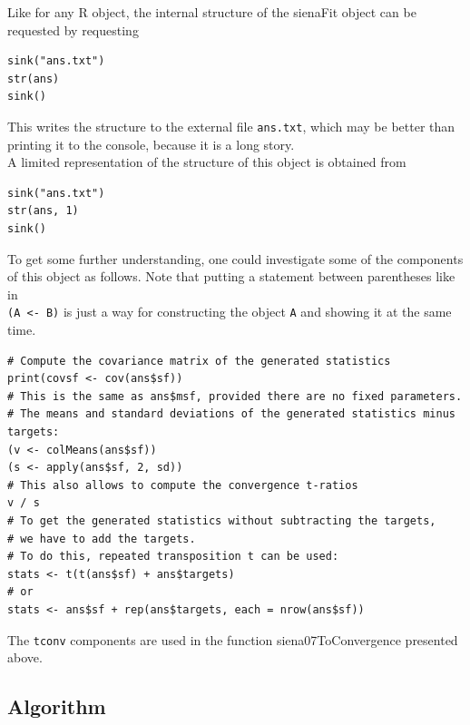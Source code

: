 \documentclass[a4paper,fleqn,11pt]{article}
\newcommand{\+}{\, + \,}
\newcommand{\R}{{\sf R }}
\begin{document}
Like for any \R object, the internal structure of the \textsf{sienaFit} object
can be requested by requesting
\begin{verbatim}
sink("ans.txt")
str(ans)
sink()
\end{verbatim}
This writes the structure to the external file \texttt{ans.txt}, which may
be better than printing it to the console, because it is a long story.\\
A limited representation of the structure of this object is obtained from
\begin{verbatim}
sink("ans.txt")
str(ans, 1)
sink()
\end{verbatim}

To get some further understanding, one could investigate some of the components
of this object as follows.
Note that putting a statement between parentheses like in\\
\texttt{(A <- B)} is just a way for
constructing the object \texttt{A} and showing it at the same time.
\begin{verbatim}
# Compute the covariance matrix of the generated statistics
print(covsf <- cov(ans$sf))
# This is the same as ans$msf, provided there are no fixed parameters.
# The means and standard deviations of the generated statistics minus targets:
(v <- colMeans(ans$sf))
(s <- apply(ans$sf, 2, sd))
# This also allows to compute the convergence t-ratios
v / s
# To get the generated statistics without subtracting the targets,
# we have to add the targets.
# To do this, repeated transposition t can be used:
stats <- t(t(ans$sf) + ans$targets)
# or
stats <- ans$sf + rep(ans$targets, each = nrow(ans$sf))
\end{verbatim}

The \texttt{tconv} components are used
in the function \textsf{siena07ToConvergence}
presented above.

\subsection{Algorithm}
\label{S_algorithm}
\end{document}
